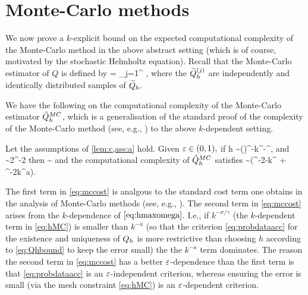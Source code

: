 \section{Monte-Carlo methods}\label{sec:mc}

We now prove a $k$-explicit bound on the expected computational complexity of the Monte-Carlo method in the above abstract setting (which is of course, motivated by the stochastic Helmholtz equation). Recall that the Monte-Carlo estimator of $Q$ is defined by
\beqs
\QhatMC =  \sum_{j=1}^{\NMC} \Qhtildesj,
\eeqs
where the $\widetilde{Q}_{h}^{(j)}$ are independently and identically distributed samples of $\widetilde{Q}_{h}.$

We have the following  on the computational complexity of the Monte-Carlo estimator $\hat{Q}^{MC}_{h}$, which is a generalisation of the standard proof of the complexity of the Monte-Carlo method (see, e.g., \cite[Section 2.1]{ClGiScTe:11}) to the above $k$-dependent setting.

\label{thm:hhmc}
Let the assumptions of \cref{lem:c,ass:a} hold. Given $\varepsilon \in (0,1),$ if
\beq\label{eq:hMC}
h \sim \mleft(\co\mright)^{-}k^{-\frac\sigma\alpha}\eps^{},
\eeq
and
\beq\label{eq:NMC}
\NMC  \sim 2\VAR{\Qhtilde}\eps^{-2}
\eeq
then
\beq\label{eq:mcerror}
\err{\QhatMC} \sim \eps
\eeq
and the computational complexity of $\hat{Q}^{MC}_{h}$ satisfies
\beq\label{eq:mccost}
\EXP{\CMC} \sim \VAR{\Qhtilde}\mleft(\eps^{-2-\frac{\gamma}{\alpha}}k^{\frac{\gamma\sigma}\alpha} + \eps^{-2}k^{a\gamma}\mright).
\eeq
\enth

The first term in \cref{eq:mccost} is analgous to the standard cost term one obtains in the analysis of Monte-Carlo methods (see, e.g., \cite[Section 2.1]{ClGiScTe:11}). The second term in \cref{eq:mccost} arises from the $k$-dependence of $\cref{eq:hmaxomega}$. I.e., if $k^{-\sigma/\gamma}$ (the $k$-dependent term in \cref{eq:hMC}) is smaller than $k^{-a}$ (so that the criterion \cref{eq:probdataacc} for the existence and uniqueness of $Q_{h}$ is more restrictive than choosing $h$ according to \cref{eq:Qhbound} to keep the error small) the the $k^{-a}$ term dominates. The reason the second term in \cref{eq:mccost} has a better $\varepsilon$-dependence than the first term is that \cref{eq:probdataacc} is an $\varepsilon$-independent criterion, whereas ensuring the error is small (via the mesh constraint \cref{eq:hMC}) is an $\varepsilon$-dependent criterion.

